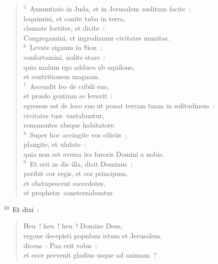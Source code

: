 \begin{verse}${}^{5}$~Annuntiate in Juda, et in Jerusalem auditum facite~:\\ loquimini, et canite tuba in terra,\\ clamate fortiter, et dicite~:\\ Congregamini, et ingrediamur civitates munitas.\\
${}^{6}$~Levate signum in Sion~;\\ confortamini, nolite stare~:\\ quia malum ego adduco ab aquilone,\\ et contritionem magnam.\\
${}^{7}$~Ascendit leo de cubili suo,\\ et pr\ae do gentium se levavit~:\\ egressus est de loco suo ut ponat terram tuam in solitudinem~:\\ civitates tu\ae\ vastabuntur,\\ remanentes absque habitatore.\\
${}^{8}$~Super hoc accingite vos ciliciis~;\\ plangite, et ululate~:\\ quia non est aversa ira furoris Domini a nobis.\\
${}^{9}$~Et erit in die illa, dicit Dominus~:\\ peribit cor regis, et cor principum,\\ et obstupescent sacerdotes,\\ et prophet\ae\ consternabuntur.\end{verse}


${}^{10}$~Et dixi~: \begin{verse}Heu~! heu~! heu~! Domine Deus,\\ ergone decepisti populum istum et Jerusalem,\\ dicens~: Pax erit vobis~:\\ et ecce pervenit gladius usque ad animam~?\end{verse}


